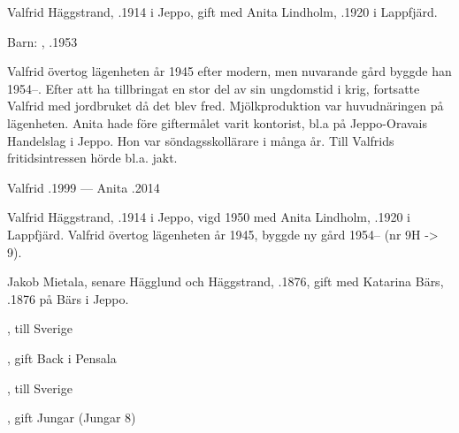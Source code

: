 %
Valfrid Häggstrand, .1914 i Jeppo, gift med Anita Lindholm, .1920 i Lappfjärd.

Barn: , .1953

Valfrid övertog lägenheten år 1945 efter modern, men nuvarande gård byggde han 1954--. Efter att ha tillbringat en stor del av sin ungdomstid i krig, fortsatte Valfrid med jordbruket då det blev fred. Mjölkproduktion var huvudnäringen på lägenheten. Anita hade före giftermålet varit kontorist, bl.a på Jeppo-Oravais Handelslag i Jeppo. Hon var söndagsskollärare i många år. Till Valfrids fritidsintressen hörde bl.a. jakt.

Valfrid .1999  ---  Anita .2014


%

%
Valfrid Häggstrand, .1914 i Jeppo, vigd 1950 med Anita Lindholm, .1920 i Lappfjärd. Valfrid övertog lägenheten år 1945, byggde ny gård 1954-- (nr 9H -> 9).\jhvspace{}


%
Jakob Mietala, senare Hägglund och Häggstrand, .1876, gift med Katarina Bärs, .1876 på Bärs i Jeppo.
\begin{jhchildren}
  \item {}
  \item {}, till Sverige
  \item {}
  \item {}, gift Back i Pensala
  \item {}, till Sverige
  \item {}, gift Jungar (Jungar 8)
  \item {}
  \item {}
\end{jhchildren}

